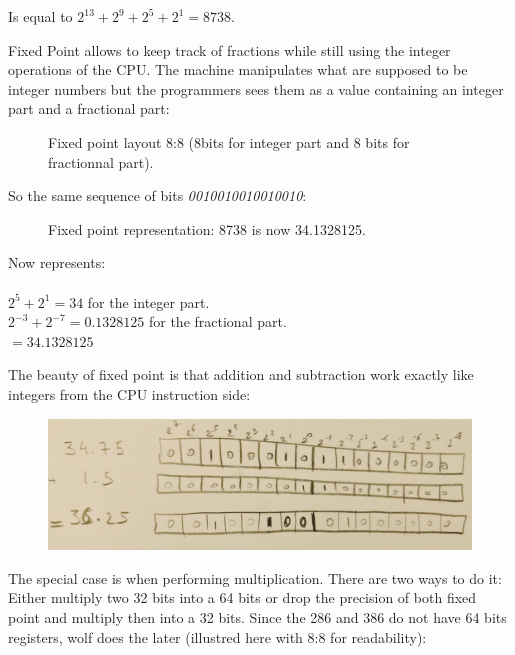  Is equal to $ 2^{13} + 2^9 + 2^5 + 2^1 =  8738 $.\\
 \par

Fixed Point allows to keep track of fractions while still using the integer operations of the CPU. The machine manipulates what are supposed to be integer numbers but the programmers sees them as a value containing an integer part and a fractional part:\\
\par
\begin{figure}[H]
 \centering
  
 \caption{Fixed point layout 8:8 (8bits for integer part and 8 bits for fractionnal part).} \label{fig:mips}
\end{figure}

So the same sequence of bits \emph{0010010010010010}:
\begin{figure}[H]
 \centering
   
  \caption{Fixed point representation: 8738 is now 34.1328125.} \label{fig:mips}
\end{figure} 

Now represents:\\
\\
$ 2^5 + 2^1 = 34 $ for the integer part.\\
$ 2^{-3}+2^{-7} = 0.1328125 $ for the fractional part.\\
$ = 34.1328125$\\

\bigskip

The beauty of fixed point is that addition and subtraction work exactly like integers from the CPU instruction side:\\



\par
\begin{figure}[H]
  \centering
 \includegraphics[width=\textwidth]{imgs/fixed_point_addition.png}
\end{figure}
\par


 The special case is when performing multiplication. There are two ways to do it: Either multiply two 32 bits into a 64 bits or drop the precision of both fixed point and multiply then into a 32 bits. Since the 286 and 386 do not have 64 bits registers, wolf does the later (illustred here with 8:8 for readability):

